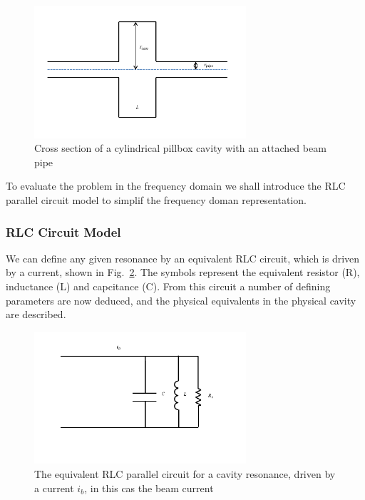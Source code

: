 \begin{figure}
\begin{center}
\includegraphics[width=0.7\textwidth]{Wakefields_and_Impedances/figures/pillbox-cav.pdf}
\end{center}
\caption{Cross section of a cylindrical pillbox cavity with an attached beam pipe}
\label{fig:cylin_geo_diagram}
\end{figure}

To evaluate the problem in the frequency domain we shall introduce the RLC parallel circuit model to simplif the frequency doman representation.

\subsubsection{RLC Circuit Model}

We can define any given resonance by an equivalent RLC circuit, which is driven by a current, shown in Fig.~\ref{fig:rlc_circ}. The symbols represent the equivalent resistor (R), inductance (L) and capcitance (C). From this circuit a number of defining parameters are now deduced, and the physical equivalents in the physical cavity are described.

\begin{figure}
\begin{center}
\includegraphics[width=0.7\textwidth]{Wakefields_and_Impedances/figures/equiv-circuit.pdf}
\end{center}
\caption{The equivalent RLC parallel circuit for a cavity resonance, driven by a current $i_{b}$, in this cas the beam current}
\label{fig:rlc_circ}
\end{figure}

